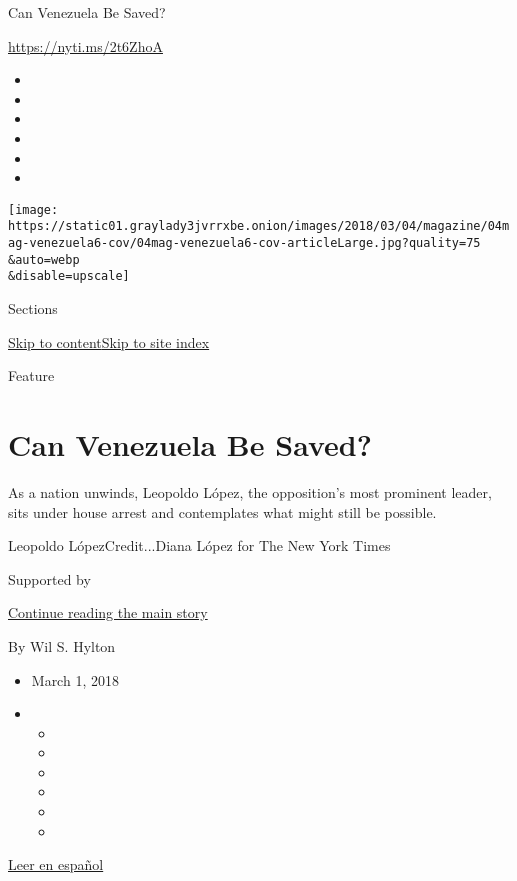 Can Venezuela Be Saved?

\url{https://nyti.ms/2t6ZhoA}

\begin{itemize}
\item
\item
\item
\item
\item
\item
\end{itemize}

\texttt{[image: https://static01.graylady3jvrrxbe.onion/images/2018/03/04/magazine/04mag-venezuela6-cov/04mag-venezuela6-cov-articleLarge.jpg?quality=75\\\&auto=webp\\\&disable=upscale]}

Sections

\protect\hyperlink{site-content}{Skip to
content}\protect\hyperlink{site-index}{Skip to site index}

Feature

\hypertarget{can-venezuela-be-saved}{%
\section{Can Venezuela Be Saved?}\label{can-venezuela-be-saved}}

As a nation unwinds, Leopoldo López, the opposition's most prominent
leader, sits under house arrest and contemplates what might still be
possible.

Leopoldo LópezCredit...Diana López for The New York Times

Supported by

\protect\hyperlink{after-sponsor}{Continue reading the main story}

By Wil S. Hylton

\begin{itemize}
\item
  March 1, 2018
\item
  \begin{itemize}
  \item
  \item
  \item
  \item
  \item
  \item
  \end{itemize}
\end{itemize}

\href{https://www.nytimes3xbfgragh.onion/es/2018/03/01/leopoldo-lopez-venezuela-oposicion/}{Leer
en español}

